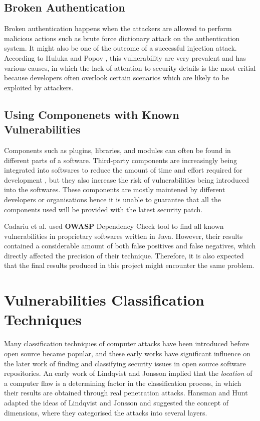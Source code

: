 \documentclass[12pt, a4paper]{report}
\begin{document}
\subsection{Broken Authentication}
Broken authentication happens when the attackers are allowed to perform malicious actions such as
brute force dictionary attack on the authentication system. It might also be one of the outcome of a
successful injection attack. According to Huluka and Popov \cite{huluka_2012}, this vulnerability
are very prevalent and has various causes, in which the lack of attention to security details is the
most critial because developers often overlook certain scenarios which are likely to be exploited by
attackers.

\subsection{Using Componenets with Known Vulnerabilities}
Components such as plugins, libraries, and modules can often be found in different parts of a
software. Third-party components are increasingly being integrated into softwares to reduce the
amount of time and effort required for development \cite{balzarotti_2006}, but they also increase
the risk of vulnerabilities being introduced into the softwares. These components are mostly
maintened by different developers or organisations hence it is unable to guarantee that all the
components used will be provided with the latest security patch.

Cadariu et al. \cite{cadariu_2015} used \textbf{OWASP} Dependency Check tool \cite{owasp_dependency}
to find all known vulnerabilities in proprietary softwares written in Java. However, their results
contained a considerable amount of both false positives and false negatives, which directly affected
the precision of their technique. Therefore, it is also expected that the final results produced in
this project might encounter the same problem.

\section{Vulnerabilities Classification Techniques}
Many classification techniques of computer attacks have been introduced before open source became
popular, and these early works have significant influence on the later work of finding and
classifying security issues in open source software repositories. An early work of Lindqvist and
Jonsson \cite{lindqvist_1999} implied that the \textit{location} of a computer flaw is a determining
factor in the classification process, in which their results are obtained through real penetration
attacks. Hansman and Hunt \cite{hansman_2005} adapted the ideas of Lindqvist and Jonsson and
suggested the concept of dimensions, where they categorised the attacks into several layers.
\end{document}
